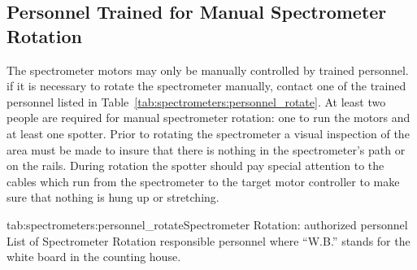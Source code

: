{\subsection{Personnel Trained for Manual Spectrometer Rotation}

The spectrometer motors may only be manually controlled by trained personnel. if it
is necessary to rotate the spectrometer manually, contact one of the trained
personnel listed in Table~\ref{tab:spectrometers:personnel_rotate}.
At least two people are required for manual spectrometer rotation: one to
run the motors and at least one spotter. Prior to rotating the spectrometer
a visual inspection of the area must be made to insure that there
is nothing in the spectrometer's path or on the rails. During rotation
the spotter should pay special attention to
the cables which run from the
spectrometer to the target motor controller to make sure that
nothing is hung up or stretching.

\begin{namestab}{tab:spectrometers:personnel_rotate}{Spectrometer Rotation: authorized personnel}{%
      List of Spectrometer Rotation responsible personnel where ``W.B.'' stands for the white board 
      in the counting house.}
   \MikeFowler{}
   \WalterKellner{}
   \AndyKenyon{}
   \JoeBeaufait{}
\end{namestab}
}


